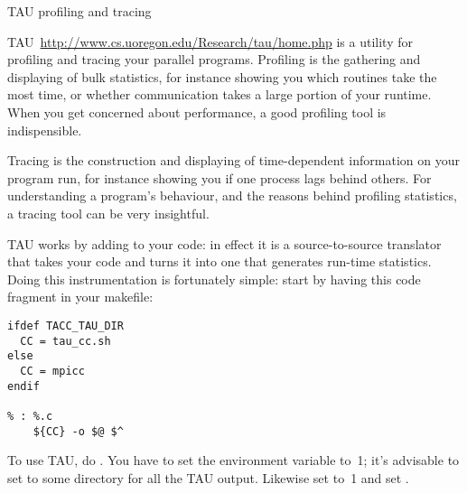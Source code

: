  {TAU profiling and tracing}

TAU~\url{http://www.cs.uoregon.edu/Research/tau/home.php} is a utility
for profiling and tracing your parallel programs. Profiling is the
gathering and displaying of bulk statistics, for instance showing you
which routines take the most time, or whether communication takes a
large portion of your runtime. When you get concerned about
performance, a good profiling tool is indispensible.

Tracing is the construction and displaying of time-dependent
information on  your program run, for instance showing you if one
process lags behind others. For understanding a program's behaviour,
and the reasons behind profiling statistics, a tracing tool can be
very insightful.

TAU works by adding  to your code: in
effect it is a source-to-source translator that takes your code and
turns it into one that generates run-time statistics. Doing this
instrumentation is fortunately simple: start by having this code
fragment in your makefile:
\begin{verbatim}
ifdef TACC_TAU_DIR
  CC = tau_cc.sh
else
  CC = mpicc
endif

% : %.c
	${CC} -o $@ $^
\end{verbatim}

\begin{istc}
To use TAU, do . You have to set the environment
variable  to~1; it's advisable to set  to some directory 
for all the TAU output. Likewise set  to~1 and set .
\end{istc}

